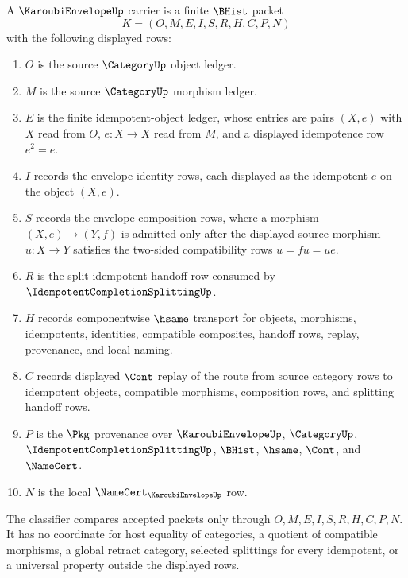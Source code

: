 \begin{definition}
\label{def:karoubi-envelope-carrier}
A $\KaroubiEnvelopeUp$ carrier is a finite $\BHist$ packet
$$
K=(O,M,E,I,S,R,H,C,P,N)
$$
with the following displayed rows:
\begin{enumerate}
\item $O$ is the source $\CategoryUp$ object ledger.
\item $M$ is the source $\CategoryUp$ morphism ledger.
\item $E$ is the finite idempotent-object ledger, whose entries are pairs $(X,e)$ with $X$ read from $O$, $e:X\to X$ read from $M$, and a displayed idempotence row $e^2=e$.
\item $I$ records the envelope identity rows, each displayed as the idempotent $e$ on the object $(X,e)$.
\item $S$ records the envelope composition rows, where a morphism $(X,e)\to(Y,f)$ is admitted only after the displayed source morphism $u:X\to Y$ satisfies the two-sided compatibility rows $u=fu=ue$.
\item $R$ is the split-idempotent handoff row consumed by $\IdempotentCompletionSplittingUp$.
\item $H$ records componentwise $\hsame$ transport for objects, morphisms, idempotents, identities, compatible composites, handoff rows, replay, provenance, and local naming.
\item $C$ records displayed $\Cont$ replay of the route from source category rows to idempotent objects, compatible morphisms, composition rows, and splitting handoff rows.
\item $P$ is the $\Pkg$ provenance over $\KaroubiEnvelopeUp$, $\CategoryUp$, $\IdempotentCompletionSplittingUp$, $\BHist$, $\hsame$, $\Cont$, and $\NameCert$.
\item $N$ is the local $\NameCert_{\KaroubiEnvelopeUp}$ row.
\end{enumerate}
The classifier compares accepted packets only through $O,M,E,I,S,R,H,C,P,N$. It has no coordinate for host equality of categories, a quotient of compatible morphisms, a global retract category, selected splittings for every idempotent, or a universal property outside the displayed rows.
\end{definition}

